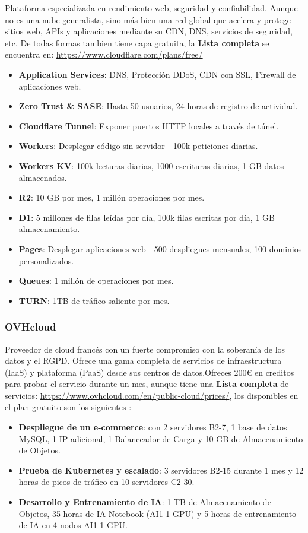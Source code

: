 Plataforma especializada en rendimiento web, seguridad y confiabilidad. Aunque no es una nube generalista, sino más bien una red global que acelera y protege sitios web, APIs y aplicaciones mediante su CDN, DNS, servicios de seguridad, etc. De todas formas tambien tiene capa gratuita, la \textbf{Lista completa} se encuentra en: \url{https://www.cloudflare.com/plans/free/}

\begin{itemize}
	\item \textbf{Application Services}: DNS, Protección DDoS, CDN con SSL, Firewall de aplicaciones web.
	\item \textbf{Zero Trust \& SASE}: Hasta 50 usuarios, 24 horas de registro de actividad.
	\item \textbf{Cloudflare Tunnel}: Exponer puertos HTTP locales a través de túnel.
	\item \textbf{Workers}: Desplegar código sin servidor - 100k peticiones diarias.
	\item \textbf{Workers KV}: 100k lecturas diarias, 1000 escrituras diarias, 1 GB datos almacenados.
	\item \textbf{R2}: 10 GB por mes, 1 millón operaciones por mes.
	\item \textbf{D1}: 5 millones de filas leídas por día, 100k filas escritas por día, 1 GB almacenamiento.
	\item \textbf{Pages}: Desplegar aplicaciones web - 500 despliegues mensuales, 100 dominios personalizados.
	\item \textbf{Queues}: 1 millón de operaciones por mes.
	\item \textbf{TURN}: 1TB de tráfico saliente por mes.
\end{itemize}

\subsubsection*{OVHcloud}

Proveedor de cloud francés con un fuerte compromiso con la soberanía de los datos y el RGPD. Ofrece una gama completa de servicios de infraestructura (IaaS) y plataforma (PaaS) desde sus centros de datos.Ofreces 200€ en creditos para probar el servicio durante un mes, aunque tiene una \textbf{Lista completa} de servicios: \url{https://www.ovhcloud.com/en/public-cloud/prices/}, los disponibles en el plan gratuito son los siguientes \citep{OVHCloudFree}:
\begin{itemize}
\item \textbf{Despliegue de un e-commerce}:
con 2 servidores B2-7, 1 base de datos MySQL, 1 IP adicional, 1 Balanceador de Carga  y 10 GB de Almacenamiento de Objetos.

\item \textbf{Prueba de Kubernetes y escalado}: 3 servidores B2-15 durante 1 mes y 12 horas de picos de tráfico en 10 servidores C2-30.

\item \textbf{Desarrollo y Entrenamiento de IA}: 1 TB de Almacenamiento de Objetos, 35 horas de IA Notebook (AI1-1-GPU) y 5 horas de entrenamiento de IA en 4 nodos AI1-1-GPU.
\end{itemize}


